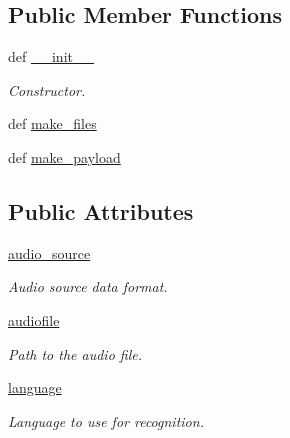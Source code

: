 \subsection*{Public Member Functions}
\begin{DoxyCompactItemize}
\item 
def \hyperlink{classRappCloud_1_1CloudMsgs_1_1SpeechRecognitionGoogle_1_1SpeechRecognitionGoogle_1_1Request_ad60b2bee85f9e2bf595dc9f1ae59a815}{\-\_\-\-\_\-init\-\_\-\-\_\-}
\begin{DoxyCompactList}\small\item\em Constructor. \end{DoxyCompactList}\item 
def \hyperlink{classRappCloud_1_1CloudMsgs_1_1SpeechRecognitionGoogle_1_1SpeechRecognitionGoogle_1_1Request_a7cad0ddc365fce31a917a17db7b41522}{make\-\_\-files}
\item 
def \hyperlink{classRappCloud_1_1CloudMsgs_1_1SpeechRecognitionGoogle_1_1SpeechRecognitionGoogle_1_1Request_a2675987551260c9562619fa8b7e472fb}{make\-\_\-payload}
\end{DoxyCompactItemize}
\subsection*{Public Attributes}
\begin{DoxyCompactItemize}
\item 
\hyperlink{classRappCloud_1_1CloudMsgs_1_1SpeechRecognitionGoogle_1_1SpeechRecognitionGoogle_1_1Request_a8d6816c8d823e3e449f1650d09695a1b}{audio\-\_\-source}
\begin{DoxyCompactList}\small\item\em Audio source data format. \end{DoxyCompactList}\item 
\hyperlink{classRappCloud_1_1CloudMsgs_1_1SpeechRecognitionGoogle_1_1SpeechRecognitionGoogle_1_1Request_afee897847a40fcbbf122418e90d43972}{audiofile}
\begin{DoxyCompactList}\small\item\em Path to the audio file. \end{DoxyCompactList}\item 
\hyperlink{classRappCloud_1_1CloudMsgs_1_1SpeechRecognitionGoogle_1_1SpeechRecognitionGoogle_1_1Request_a9e71c439b362e7f7691a73d7b8418c55}{language}
\begin{DoxyCompactList}\small\item\em Language to use for recognition. \end{DoxyCompactList}\end{DoxyCompactItemize}


